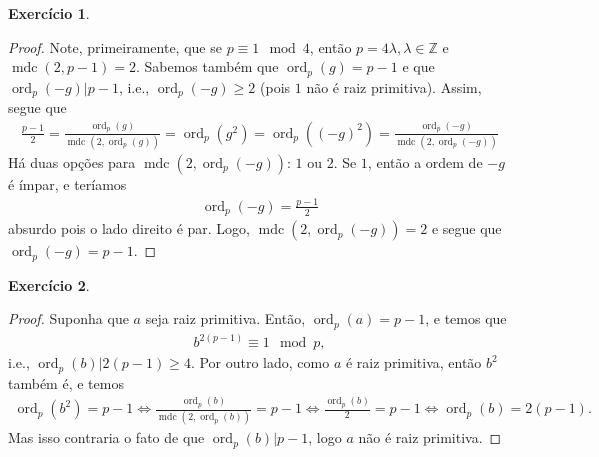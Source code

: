 \documentclass[a4paper,12pt]{article}
\DeclareMathOperator{\mdc}{mdc}
\DeclareMathOperator{\ord}{ord}
\theoremstyle{definition}
\newtheorem{exercise}{Exercício}%
\begin{document}
	\begin{exercise}
		\begin{proof}
			Note, primeiramente, que se $p\equiv 1\mod 4$, então $p = 4\lambda, \lambda\in\mathbb{Z}$ e $\mdc(2,p-1) = 2$. Sabemos também que $\ord_p(g) = p-1$ e que $\ord_p(-g)|p-1$, i.e., $\ord_p(-g)\geq 2$ (pois $1$ não é raiz primitiva). Assim, segue que
			\begin{align*}
			\frac{p-1}{2} = \frac{\ord_p(g)}{\mdc(2,\ord_p(g))} = \ord_p(g^2) = \ord_p((-g)^2) = \frac{\ord_p(-g)}{\mdc(2,\ord_p(-g))} %
			\end{align*}
			Há duas opções para $\mdc(2,\ord_p(-g))$: $1$ ou $2$. Se $1$, então a ordem de $-g$ é ímpar, e teríamos
			\begin{align*}
			\ord_p(-g) = \frac{p-1}{2}
			\end{align*}
			absurdo pois o lado direito é par. Logo, $\mdc(2,\ord_p(-g)) = 2$ e segue que $\ord_p(-g) = p-1$.
		\end{proof}
	\end{exercise}

	\begin{exercise}
		\begin{proof}
			Suponha que $a$ seja raiz primitiva. Então, $\ord_p(a) = p-1$, e temos que
			\begin{align*}
			b^{2(p-1)}\equiv 1\mod p,
			\end{align*} 
			i.e., $\ord_p(b)|2(p-1)\geq 4$. Por outro lado, como $a$ é raiz primitiva, então $b^2$ também é, e temos
			\begin{align*}
			\ord_p(b^2) = p-1 \Longleftrightarrow \frac{\ord_p(b)}{\mdc(2,\ord_p(b))} = p-1 \Longleftrightarrow \frac{\ord_p(b)}{2} = p-1 \Longleftrightarrow \ord_p(b) = 2(p-1).
			\end{align*}
			Mas isso contraria o fato de que $\ord_p(b)|p-1$, logo $a$ não é raiz primitiva.
		\end{proof}
	\end{exercise}
	
	
	
\end{document}
